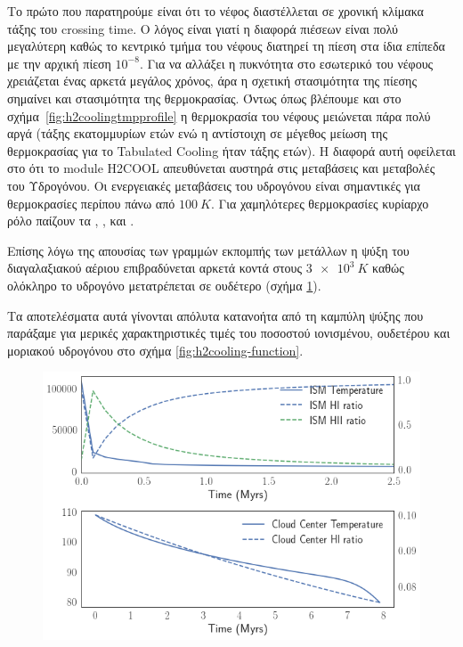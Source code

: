 	Το πρώτο που παρατηρούμε είναι ότι το νέφος διαστέλλεται σε χρονική κλίμακα τάξης του crossing time. Ο λόγος είναι γιατί η διαφορά πιέσεων είναι πολύ μεγαλύτερη καθώς το κεντρικό τμήμα του νέφους διατηρεί τη πίεση στα ίδια επίπεδα με την αρχική πίεση $10^{-8}$. Για να αλλάξει η πυκνότητα στο εσωτερικό του νέφους χρειάζεται ένας αρκετά μεγάλος χρόνος, άρα η σχετική στασιμότητα της πίεσης σημαίνει και στασιμότητα της θερμοκρασίας. Όντως όπως βλέπουμε και στο σχήμα~\ref{fig:h2coolingtmpprofile} η θερμοκρασία του νέφους μειώνεται πάρα πολύ αργά (τάξης εκατομμυρίων ετών ενώ η αντίστοιχη σε μέγεθος μείωση της θερμοκρασίας για το Tabulated Cooling ήταν τάξης ετών). Η διαφορά αυτή οφείλεται στο ότι το module H2COOL απευθύνεται αυστηρά στις μεταβάσεις και μεταβολές του Υδρογόνου. Οι ενεργειακές μεταβάσεις του υδρογόνου είναι σημαντικές για θερμοκρασίες περίπου πάνω από $\SI{100}{K}$. Για χαμηλότερες θερμοκρασίες κυρίαρχο ρόλο παίζουν τα , ,  και .
	
	Επίσης λόγω της απουσίας των γραμμών εκπομπής των μετάλλων η ψύξη του διαγαλαξιακού αέριου επιβραδύνεται αρκετά κοντά στους $\SI{3e3}{K}$ καθώς ολόκληρο το υδρογόνο μετατρέπεται σε ουδέτερο (σχήμα \ref{fig:h2coolingtmpcenterism}). 
	
		Τα αποτελέσματα αυτά γίνονται απόλυτα κατανοήτα από τη καμπύλη ψύξης που παράξαμε για μερικές χαρακτηριστικές τιμές του ποσοστού ιονισμένου, ουδετέρου και μοριακού υδρογόνου στο σχήμα \ref{fig:h2cooling-function}.
	

\begin{figure}
	\centering
	\includegraphics[width=1\linewidth]{DataImages/H2CoolingTMPcenterISM}
	\caption{}
	\label{fig:h2coolingtmpcenterism}
\end{figure}

